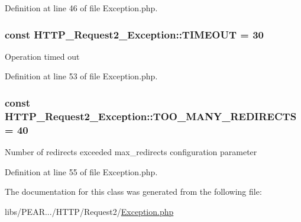 Definition at line 46 of file Exception.\+php.

\hypertarget{classHTTP__Request2__Exception_a9eff2e63fc4d2ac0e2692610c7709ac9}{}
\subsubsection[{T\+I\+M\+E\+O\+U\+T}]{\setlength{\rightskip}{0pt plus 5cm}const H\+T\+T\+P\+\_\+\+Request2\+\_\+\+Exception\+::\+T\+I\+M\+E\+O\+U\+T = 30}\label{classHTTP__Request2__Exception_a9eff2e63fc4d2ac0e2692610c7709ac9}
Operation timed out 

Definition at line 53 of file Exception.\+php.

\hypertarget{classHTTP__Request2__Exception_accfb520aa06566f09fe26138beb3da62}{}
\subsubsection[{T\+O\+O\+\_\+\+M\+A\+N\+Y\+\_\+\+R\+E\+D\+I\+R\+E\+C\+T\+S}]{\setlength{\rightskip}{0pt plus 5cm}const H\+T\+T\+P\+\_\+\+Request2\+\_\+\+Exception\+::\+T\+O\+O\+\_\+\+M\+A\+N\+Y\+\_\+\+R\+E\+D\+I\+R\+E\+C\+T\+S = 40}\label{classHTTP__Request2__Exception_accfb520aa06566f09fe26138beb3da62}
Number of redirects exceeded \textquotesingle{}max\+\_\+redirects\textquotesingle{} configuration parameter 

Definition at line 55 of file Exception.\+php.



The documentation for this class was generated from the following file\+:\begin{DoxyCompactItemize}
\item 
libs/\+P\+E\+A\+R.../\+H\+T\+T\+P/\+Request2/\hyperlink{HTTP_2Request2_2Exception_8php}{Exception.\+php}\end{DoxyCompactItemize}
